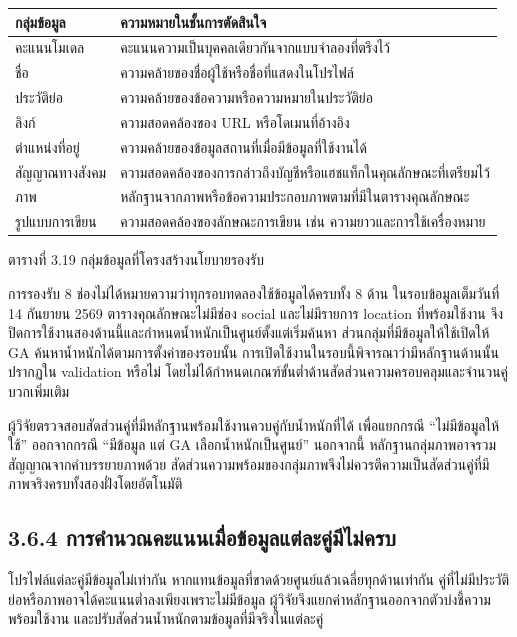 \documentclass[12pt,a4paper]{report}
\begin{document}
\begin{center}\small
\begin{tabularx}{\linewidth}{p{2.5cm}X}
\toprule
กลุ่มข้อมูล & ความหมายในชั้นการตัดสินใจ \\
\midrule
คะแนนโมเดล & คะแนนความเป็นบุคคลเดียวกันจากแบบจำลองที่ตรึงไว้ \\
ชื่อ & ความคล้ายของชื่อผู้ใช้หรือชื่อที่แสดงในโปรไฟล์ \\
ประวัติย่อ & ความคล้ายของข้อความหรือความหมายในประวัติย่อ \\
ลิงก์ & ความสอดคล้องของ URL หรือโดเมนที่อ้างอิง \\
ตำแหน่งที่อยู่ & ความคล้ายของข้อมูลสถานที่เมื่อมีข้อมูลที่ใช้งานได้ \\
สัญญาณทางสังคม & ความสอดคล้องของการกล่าวถึงบัญชีหรือแฮชแท็กในคุณลักษณะที่เตรียมไว้ \\
ภาพ & หลักฐานจากภาพหรือข้อความประกอบภาพตามที่มีในตารางคุณลักษณะ \\
รูปแบบการเขียน & ความสอดคล้องของลักษณะการเขียน เช่น ความยาวและการใช้เครื่องหมาย \\
\bottomrule
\end{tabularx}
\par ตารางที่ 3.19 กลุ่มข้อมูลที่โครงสร้างนโยบายรองรับ
\end{center}

การรองรับ 8 ช่องไม่ได้หมายความว่าทุกรอบทดลองใช้ข้อมูลได้ครบทั้ง 8 ด้าน ในรอบข้อมูลเต็มวันที่ 14 กันยายน 2569 ตารางคุณลักษณะไม่มีช่อง social และไม่มีรายการ location ที่พร้อมใช้งาน จึงปิดการใช้งานสองด้านนี้และกำหนดน้ำหนักเป็นศูนย์ตั้งแต่เริ่มค้นหา ส่วนกลุ่มที่มีข้อมูลให้ใช้เปิดให้ GA ค้นหาน้ำหนักได้ตามการตั้งค่าของรอบนั้น การเปิดใช้งานในรอบนี้พิจารณาว่ามีหลักฐานด้านนั้นปรากฏใน validation หรือไม่ โดยไม่ได้กำหนดเกณฑ์ขั้นต่ำด้านสัดส่วนความครอบคลุมและจำนวนคู่บวกเพิ่มเติม

ผู้วิจัยตรวจสอบสัดส่วนคู่ที่มีหลักฐานพร้อมใช้งานควบคู่กับน้ำหนักที่ได้ เพื่อแยกกรณี ``ไม่มีข้อมูลให้ใช้'' ออกจากกรณี ``มีข้อมูล แต่ GA เลือกน้ำหนักเป็นศูนย์'' นอกจากนี้ หลักฐานกลุ่มภาพอาจรวมสัญญาณจากคำบรรยายภาพด้วย สัดส่วนความพร้อมของกลุ่มภาพจึงไม่ควรตีความเป็นสัดส่วนคู่ที่มีภาพจริงครบทั้งสองฝั่งโดยอัตโนมัติ

\subsection*{3.6.4 การคำนวณคะแนนเมื่อข้อมูลแต่ละคู่มีไม่ครบ}
โปรไฟล์แต่ละคู่มีข้อมูลไม่เท่ากัน หากแทนข้อมูลที่ขาดด้วยศูนย์แล้วเฉลี่ยทุกด้านเท่ากัน คู่ที่ไม่มีประวัติย่อหรือภาพอาจได้คะแนนต่ำลงเพียงเพราะไม่มีข้อมูล ผู้วิจัยจึงแยกค่าหลักฐานออกจากตัวบ่งชี้ความพร้อมใช้งาน และปรับสัดส่วนน้ำหนักตามข้อมูลที่มีจริงในแต่ละคู่
\end{document}
